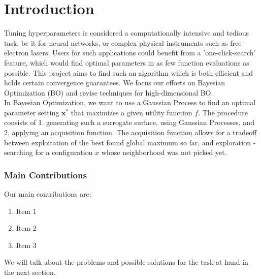 \chapter{Introduction}

Tuning hyperparameters is considered a computationally intensive and tedious task, be it for neural networks, or complex physical instruments such as free electron lasers.
Users for such applications could benefit from a 'one-click-search' feature, which would find optimal parameters in as few function evaluations as possible.
This project aims to find such an algorithm which is both efficient and holds certain convergence guarantees.
We focus our efforts on Bayesian Optimization (BO) and revise techniques for high-dimensional BO. \\

In Bayesian Optimization, we want to use a Gaussian Process to find an optimal parameter setting $\mathbf{x^*}$ that maximizes a given utility function $f$.
The procedure consists of 1. generating such a surrogate surface, using Gaussian Processes, and 2. applying an acquisition function.
The acquisition function allows for a tradeoff between exploitation of the best found global maximum so far, and exploration - searching for a configuration $x$ whose neighborhood was not picked yet.\\

\subsection{Main Contributions}

Our main contributions are:

\begin{enumerate}
\item Item 1
\item Item 2
\item Item 3
\end{enumerate}

We will talk about the problems and possible solutions for the task at hand in the next section.
